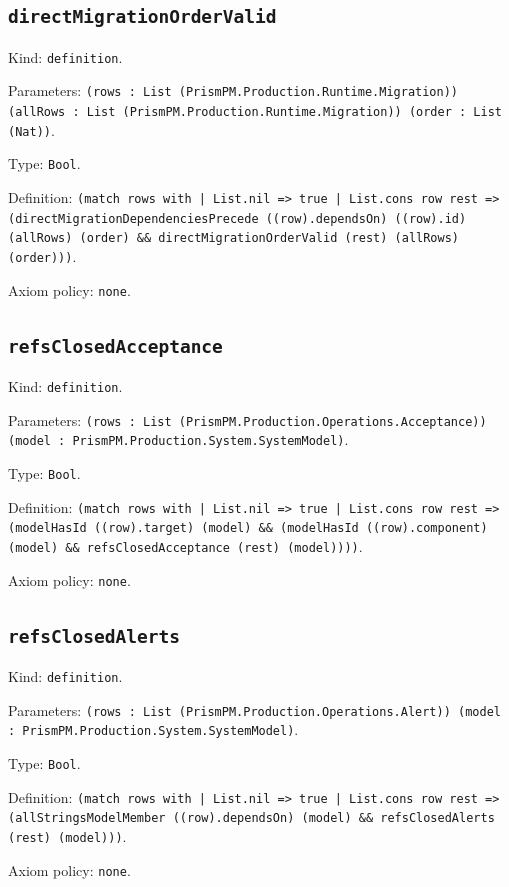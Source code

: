 \documentclass[11pt]{article}
\begin{document}
\subsection*{\texttt{directMigrationOrderValid}}
\noindent Kind: \texttt{definition}.\par
\noindent Parameters: \texttt{(rows : List (PrismPM.Production.Runtime.Migration)) (allRows : List (PrismPM.Production.Runtime.Migration)) (order : List (Nat))}.\par
\noindent Type: \texttt{Bool}.\par
\noindent Definition: \texttt{(match rows with | List.nil => true | List.cons row rest => (directMigrationDependenciesPrecede ((row).dependsOn) ((row).id) (allRows) (order) \&\& directMigrationOrderValid (rest) (allRows) (order)))}.\par
\noindent Axiom policy: \texttt{none}.\par
\subsection*{\texttt{refsClosedAcceptance}}
\noindent Kind: \texttt{definition}.\par
\noindent Parameters: \texttt{(rows : List (PrismPM.Production.Operations.Acceptance)) (model : PrismPM.Production.System.SystemModel)}.\par
\noindent Type: \texttt{Bool}.\par
\noindent Definition: \texttt{(match rows with | List.nil => true | List.cons row rest => (modelHasId ((row).target) (model) \&\& (modelHasId ((row).component) (model) \&\& refsClosedAcceptance (rest) (model))))}.\par
\noindent Axiom policy: \texttt{none}.\par
\subsection*{\texttt{refsClosedAlerts}}
\noindent Kind: \texttt{definition}.\par
\noindent Parameters: \texttt{(rows : List (PrismPM.Production.Operations.Alert)) (model : PrismPM.Production.System.SystemModel)}.\par
\noindent Type: \texttt{Bool}.\par
\noindent Definition: \texttt{(match rows with | List.nil => true | List.cons row rest => (allStringsModelMember ((row).dependsOn) (model) \&\& refsClosedAlerts (rest) (model)))}.\par
\noindent Axiom policy: \texttt{none}.\par
\end{document}
